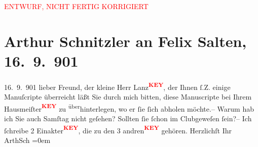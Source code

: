 
\begin{center}
            \textcolor{red}{ENTWURF, NICHT FERTIG KORRIGIERT}
                      \end{center}
            
         
         \renewcommand{\erwaehntePersonen}{Personen: Felix Salten}
         \renewcommand{\erwaehnteInstitutionen}{Institutionen: Wiener Schachclub}
         \renewcommand{\erwaehnteOrte}{Orte: Wien}
         \renewcommand{\erwaehnteWerke}{}
               \section[Arthur Schnitzler an Felix Salten, 16. 9. 901]{ Arthur Schnitzler an Felix Salten, 16. 9. 901}\nopagebreak{}\rehead{ }\begin{ledgroupsized}[t]{13cm}\normalsize\beginnumbering \toendnotes[C]{\smallbreak\pagebreak[2]} 
\toendnotes[C]{\smallbreak}\pstart
           \raggedleft{}{\pb}16. 9. 901\pend
           \pstart
           lieber Freund, der kleine Herr Lanz\textcolor{red}{\textsuperscript{\textbf{KEY}}},
               der Ihnen ſ.Z. einige Manuſcripte überreicht läßt Sie durch mich bitten, diese
               Manuscripte bei Ihrem Hausmeiſter\textcolor{red}{\textsuperscript{\textbf{KEY}}} zu \substVorne{}\textsuperscript{über}\substDazwischen{}hinter\substHinten{}legen, wo er ſie ſich abholen möchte.– \pend
           \pstart
           Warum hab ich Sie auch Samſtag nicht geſehen? Sollten ſie ſchon im Clubgeweſen ſein?– \pend
           \pstart
           Ich ſchreibe 2 Einakter\textcolor{red}{\textsuperscript{\textbf{KEY}}}, die zu den 3 andren\textcolor{red}{\textsuperscript{\textbf{KEY}}} gehören. \pend
           \pstart
           Herzlichſt Ihr {\\[\baselineskip]}\spacefill\mbox{ArthSch}\pend
           \leftskip=0em{}
         
         \endnumbering{}\end{ledgroupsized}\begin{anhang}\end{anhang}\newcommand{\dateiname}{L02970}\newcommand{\titel}{Arthur Schnitzler an Felix Salten, 16. 9. 901}\newcommand{\editorInnen}{Martin Anton Müller und Laura Untner}
      